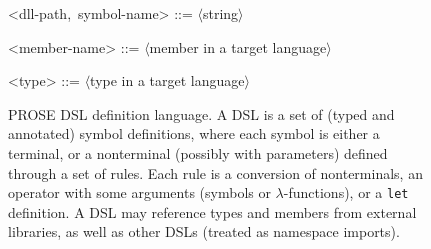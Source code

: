 \begin{figure}[p!]
\begin{fullpage}
\begin{tcolorbox}
\begin{grammar}
                <dll-path,~symbol-name> ::= \pmb{\textquotesingle}$\langle$\textup{string}$\rangle$\pmb{\textquotesingle}

                <member-name> ::= $\langle$\textup{member in a target language}$\rangle$

                <type> ::=  $\langle$\textup{type in a target language}$\rangle$
            \end{grammar}
        \end{tcolorbox}
        \caption{PROSE DSL definition language.
            A DSL is a set of (typed and annotated) symbol definitions, where each symbol is either a terminal, or a
            nonterminal (possibly with parameters) defined through a set of rules.
            Each rule is a conversion of nonterminals, an operator with some arguments (symbols or $\lambda$-functions), or
            a \texttt{let} definition.
            A DSL may reference types and members from external libraries, as well as other DSLs (treated as namespace
            imports).
        }
        \label{fig:dsldefinition}
    \end{fullpage}
\end{figure}
